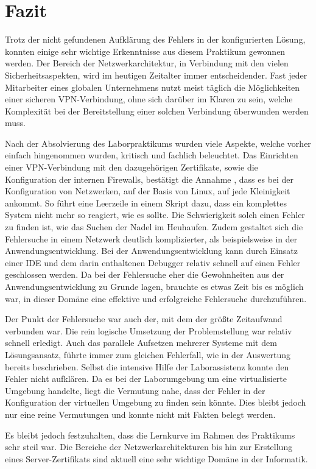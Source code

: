 \documentclass[
a4paper,     %
 headsepline, %
footsepline, %
titlepage,   %
 halfparskip,     %
 fleqn,       %
12pt         %
]{scrartcl}  %
\begin{document}
\section{Fazit}\label{Fazit}
Trotz der nicht gefundenen Aufklärung des Fehlers in der konfigurierten Lösung, konnten einige sehr wichtige Erkenntnisse aus diesem Praktikum gewonnen werden. Der Bereich der Netzwerkarchitektur, in Verbindung mit den vielen Sicherheitsaspekten, wird im heutigen Zeitalter immer entscheidender. Fast jeder Mitarbeiter eines globalen Unternehmens nutzt meist täglich die Möglichkeiten einer sicheren VPN-Verbindung, ohne sich darüber im Klaren zu sein, welche Komplexität bei der Bereitstellung einer solchen Verbindung überwunden werden muss. 

Nach der Absolvierung des Laborpraktikums wurden viele Aspekte, welche vorher einfach hingenommen wurden, kritisch und fachlich beleuchtet. Das Einrichten einer VPN-Verbindung mit den dazugehörigen Zertifikate, sowie die Konfiguration der internen Firewalls, bestätigt  die Annahme , dass es bei der Konfiguration von Netzwerken, auf der Basis von Linux, auf jede Kleinigkeit ankommt. So führt eine Leerzeile in einem Skript dazu, dass ein komplettes System nicht mehr so reagiert, wie es sollte. Die Schwierigkeit solch einen Fehler zu finden ist, wie das Suchen der Nadel im Heuhaufen. Zudem gestaltet sich die Fehlersuche in einem Netzwerk deutlich komplizierter, als beispielsweise in der Anwendungsentwicklung. Bei der Anwendungsentwicklung kann durch Einsatz einer IDE und dem darin enthaltenen Debugger relativ schnell auf einen Fehler geschlossen werden. Da bei der Fehlersuche eher die Gewohnheiten aus der Anwendungsentwicklung zu Grunde lagen, brauchte es etwas Zeit bis es möglich war, in dieser Domäne eine effektive und erfolgreiche Fehlersuche durchzuführen. 

Der Punkt der Fehlersuche war auch der, mit dem der größte Zeitaufwand verbunden war. Die rein logische Umsetzung der Problemstellung war relativ schnell erledigt. Auch das parallele Aufsetzen mehrerer Systeme mit dem Lösungsansatz, führte immer zum gleichen Fehlerfall, wie in der Auswertung bereits beschrieben. Selbst die intensive Hilfe der Laborassistenz konnte den Fehler nicht aufklären. Da es bei der Laborumgebung um eine virtualisierte Umgebung handelte, liegt die Vermutung nahe, dass der Fehler in der Konfiguration der virtuellen Umgebung zu finden sein könnte. Dies bleibt jedoch nur eine reine Vermutungen und konnte nicht mit Fakten belegt werden. 

Es bleibt jedoch festzuhalten, dass die Lernkurve im Rahmen des Praktikums sehr steil war. Die Bereiche der Netzwerkarchitekturen bis hin zur Erstellung eines Server-Zertifikats sind aktuell eine sehr wichtige Domäne in der Informatik. 
\end{document}
